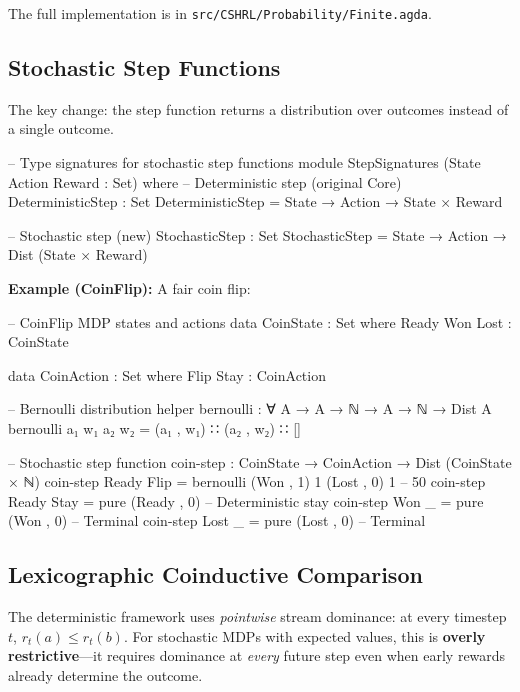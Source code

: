 \documentclass[9pt,a4paper]{article}
\newcommand{\fpath}[1]{\nolinkurl{#1}}
\theoremstyle{plain}
\theoremstyle{definition}
\theoremstyle{remark}
\begin{document}
\noindent The full implementation is in \fpath{src/CSHRL/Probability/Finite.agda}.

\subsection{Stochastic Step Functions}

The key change: the step function returns a distribution over outcomes instead of a single outcome.

\begin{code}[hide]
  -- Type signatures for stochastic step functions
  module StepSignatures (State Action Reward : Set) where
    -- Deterministic step (original Core)
    DeterministicStep : Set
    DeterministicStep = State → Action → State × Reward

    -- Stochastic step (new)
    StochasticStep : Set
    StochasticStep = State → Action → Dist (State × Reward)
\end{code}

\noindent\textbf{Example (CoinFlip):} A fair coin flip:

\begin{code}
  -- CoinFlip MDP states and actions
  data CoinState : Set where
    Ready Won Lost : CoinState

  data CoinAction : Set where
    Flip Stay : CoinAction

  -- Bernoulli distribution helper
  bernoulli : ∀ {A} → A → ℕ → A → ℕ → Dist A
  bernoulli a₁ w₁ a₂ w₂ = (a₁ , w₁) ∷ (a₂ , w₂) ∷ []

  -- Stochastic step function
  coin-step : CoinState → CoinAction → Dist (CoinState × ℕ)
  coin-step Ready Flip = bernoulli (Won , 1) 1 (Lost , 0) 1  -- 50%
  coin-step Ready Stay = pure (Ready , 0)                     -- Deterministic stay
  coin-step Won   _    = pure (Won , 0)                       -- Terminal
  coin-step Lost  _    = pure (Lost , 0)                      -- Terminal
\end{code}

\subsection{Lexicographic Coinductive Comparison}

The deterministic framework uses \emph{pointwise} stream dominance: at every timestep $t$, $r_t(a) \le r_t(b)$. For stochastic MDPs with expected values, this is \textbf{overly restrictive}---it requires dominance at \emph{every} future step even when early rewards already determine the outcome.
\end{document}

